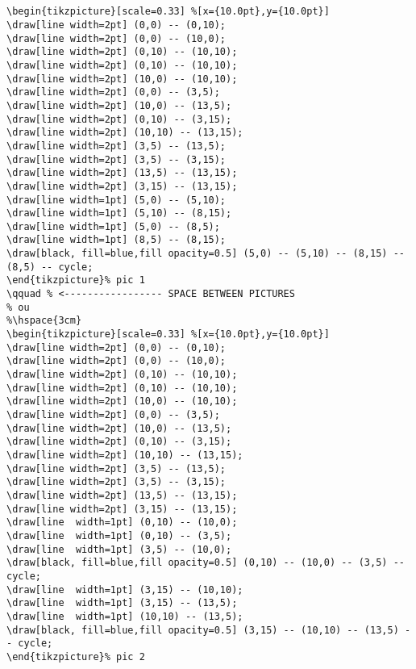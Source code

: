 \begin{lstlisting}[style=myLaTeX,caption=A cube with fixed 2d Coordinates]
    

\begin{tikzpicture}[scale=0.33] %[x={10.0pt},y={10.0pt}]
\draw[line width=2pt] (0,0) -- (0,10);
\draw[line width=2pt] (0,0) -- (10,0);
\draw[line width=2pt] (0,10) -- (10,10);
\draw[line width=2pt] (0,10) -- (10,10);
\draw[line width=2pt] (10,0) -- (10,10);
\draw[line width=2pt] (0,0) -- (3,5);
\draw[line width=2pt] (10,0) -- (13,5);
\draw[line width=2pt] (0,10) -- (3,15);
\draw[line width=2pt] (10,10) -- (13,15);
\draw[line width=2pt] (3,5) -- (13,5);
\draw[line width=2pt] (3,5) -- (3,15);
\draw[line width=2pt] (13,5) -- (13,15);
\draw[line width=2pt] (3,15) -- (13,15);
\draw[line width=1pt] (5,0) -- (5,10);
\draw[line width=1pt] (5,10) -- (8,15);
\draw[line width=1pt] (5,0) -- (8,5);
\draw[line width=1pt] (8,5) -- (8,15);
\draw[black, fill=blue,fill opacity=0.5] (5,0) -- (5,10) -- (8,15) -- (8,5) -- cycle;
\end{tikzpicture}% pic 1
\qquad % <----------------- SPACE BETWEEN PICTURES
% ou
%\hspace{3cm}
\begin{tikzpicture}[scale=0.33] %[x={10.0pt},y={10.0pt}]
\draw[line width=2pt] (0,0) -- (0,10);
\draw[line width=2pt] (0,0) -- (10,0);
\draw[line width=2pt] (0,10) -- (10,10);
\draw[line width=2pt] (0,10) -- (10,10);
\draw[line width=2pt] (10,0) -- (10,10);
\draw[line width=2pt] (0,0) -- (3,5);
\draw[line width=2pt] (10,0) -- (13,5);
\draw[line width=2pt] (0,10) -- (3,15);
\draw[line width=2pt] (10,10) -- (13,15);
\draw[line width=2pt] (3,5) -- (13,5);
\draw[line width=2pt] (3,5) -- (3,15);
\draw[line width=2pt] (13,5) -- (13,15);
\draw[line width=2pt] (3,15) -- (13,15);
\draw[line  width=1pt] (0,10) -- (10,0);
\draw[line  width=1pt] (0,10) -- (3,5);
\draw[line  width=1pt] (3,5) -- (10,0);
\draw[black, fill=blue,fill opacity=0.5] (0,10) -- (10,0) -- (3,5) -- cycle;
\draw[line  width=1pt] (3,15) -- (10,10);
\draw[line  width=1pt] (3,15) -- (13,5);
\draw[line  width=1pt] (10,10) -- (13,5);
\draw[black, fill=blue,fill opacity=0.5] (3,15) -- (10,10) -- (13,5) -- cycle;
\end{tikzpicture}% pic 2    
\end{lstlisting}


